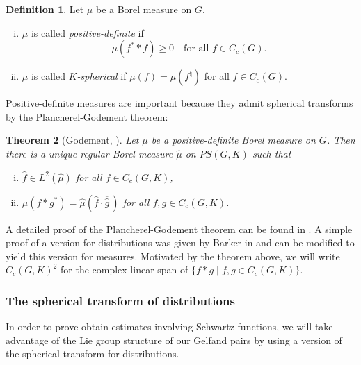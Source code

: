 \documentclass[12pt,reqno,a4paper]{amsart}
\theoremstyle{theorem}
\newtheorem{theorem}{Theorem}[section]
\theoremstyle{definition}
\newtheorem{definition}[theorem]{Definition}
\numberwithin{theorem}{section}
\numberwithin{equation}{section}
\begin{document}
\begin{definition}
	Let $\mu$ be a Borel measure on $G$. 
	\begin{enumerate}[(i)]
		\item $\mu$ is called \emph{positive-definite} if 
		\[\mu(f^**f)\geq 0\quad\text{for all $f\in C_c(G)$.}\]
		\item $\mu$ is called \emph{$K$-spherical} if $\mu(f) = \mu(f^\natural)$ for all $f\in C_c(G)$.
	\end{enumerate}
\end{definition}
Positive-definite measures are important because they admit spherical transforms by the Plancherel-Godement theorem:
\begin{theorem}[Godement, \cite{Godement}]\label{t:Godement-Plancherel_for_measures}
	Let $\mu$ be a positive-definite Borel measure on $G$. Then there is a unique regular Borel measure $\widehat{\mu}$ on $PS(G, K)$ such that
	\begin{enumerate}[(i)]
		\item $\widehat{f}\in L^2(\widehat{\mu})$ for all $f\in C_c(G,K)$,
		\item $\mu(f*g^*) = \widehat{\mu}(\widehat{f}\cdot\overline{\widehat{g}}\hspace{2pt})$ for all $f,g\in C_c(G, K)$.
	\end{enumerate}
\end{theorem}
A detailed proof of the Plancherel-Godement theorem can be found in \cite{Dieudonne}. A simple proof of a version for distributions was given by Barker in \cite{Barker} and can be modified to yield this version for measures. Motivated by the theorem above, we will write $C_c(G,K)^2$ for the complex linear span of $\{f*g\mid f,g\in C_c(G, K)\}$.
\subsubsection{The spherical transform of distributions} 
In order to prove obtain estimates involving Schwartz functions, we will take advantage of the Lie group structure of our Gelfand pairs by using a version of the spherical transform for distributions.
\end{document}
